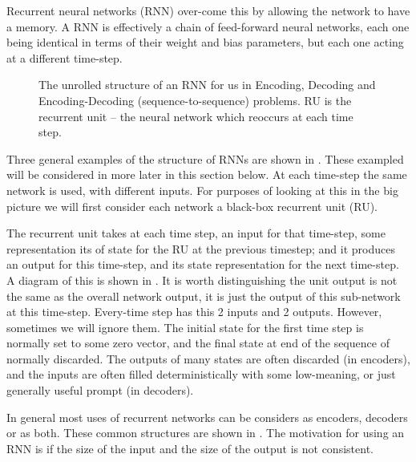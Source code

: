 \documentclass[12pt,parskip]{komatufte}
\begin{document}
Recurrent neural networks (RNN) over-come this by allowing the network to have a memory.
A RNN is effectively a chain of feed-forward neural networks,
each one being identical in terms of their weight and bias parameters,
but each one acting at a different time-step.



\begin{figure}
	\caption{The unrolled structure of an RNN for us in Encoding, Decoding and Encoding-Decoding (sequence-to-sequence) problems. RU is the recurrent unit -- the neural network which reoccurs at each time step.}
	
	\label{fig-rnns}
	
	\resizebox{\textwidth}{!}{}
\end{figure}

Three general examples of the structure of RNNs are shown in .
These exampled will be considered in more later in this section below.
At each time-step the same network is used, with different inputs.
For purposes of looking at this in the big picture we will first consider each network a black-box recurrent unit (RU).

The recurrent unit takes at each time step, an input for that time-step, some representation its of state for the RU at the previous timestep; and it produces an output for this time-step, and its state representation for the next time-step.
A diagram of this is shown in .
It is worth distinguishing the unit output is not the same as the overall network output, it is just the output of this sub-network at this time-step.
Every-time step has this 2 inputs and 2 outputs.
However, sometimes we will ignore them.
The initial state for the first time step is normally set to some zero vector,
and the final state at end of the sequence of normally discarded.
The outputs of many states are often discarded (in encoders), and the inputs are often filled deterministically with some low-meaning, or just generally useful prompt (in decoders).

In general most uses of recurrent networks can be considers as encoders, decoders or as both.
These common structures are shown in .
The motivation for using an RNN is if the size of the input and the size of the output is not consistent.
\end{document}
